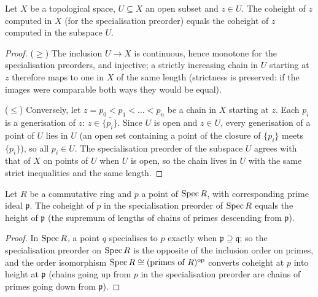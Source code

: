 \begin{lemma}
  \label{pa-lem:coheight_open_embedding}
  \leanok

  Let \(X\) be a topological space, \(U \subseteq X\) an open subset and \(z \in U\).
  The coheight of \(z\) computed in \(X\) (for the specialisation preorder) equals the
  coheight of \(z\) computed in the subspace \(U\).
\end{lemma}
\begin{proof}
  \leanok
  (\(\geq\)) The inclusion \(U \to X\) is continuous, hence monotone for the
  specialisation preorders, and injective; a strictly increasing chain in \(U\) starting
  at \(z\) therefore maps to one in \(X\) of the same length (strictness is preserved:
  if the images were comparable both ways they would be equal).

  (\(\leq\)) Conversely, let \(z = p_0 < p_1 < \dots < p_n\) be a chain in \(X\)
  starting at \(z\). Each \(p_i\) is a generisation of \(z\): \(z \in
  \overline{\{p_i\}}\). Since \(U\) is open and \(z \in U\), every generisation of a
  point of \(U\) lies in \(U\) (an open set containing a point of the closure of
  \(\{p_i\}\) meets \(\{p_i\}\)), so all \(p_i \in U\). The specialisation preorder of
  the subspace \(U\) agrees with that of \(X\) on points of \(U\) when \(U\) is open, so
  the chain lives in \(U\) with the same strict inequalities and the same length.
\end{proof}

\begin{lemma}
  \label{pa-lem:coheight_spec_height}
  \leanok

  Let \(R\) be a commutative ring and \(p\) a point of \(\operatorname{Spec} R\), with corresponding
  prime ideal \(\mathfrak p\). The coheight of \(p\) in the specialisation preorder of
  \(\operatorname{Spec} R\) equals the height of \(\mathfrak p\) (the supremum of lengths of chains of
  primes descending from \(\mathfrak p\)).
\end{lemma}
\begin{proof}
  \leanok
  In \(\operatorname{Spec} R\), a point \(q\) specialises to \(p\) exactly when
  \(\mathfrak p \supseteq \mathfrak q\); so the specialisation preorder on
  \(\operatorname{Spec} R\) is the opposite of the inclusion order on primes, and the order
  isomorphism \(\operatorname{Spec} R \cong (\text{primes of } R)^{\mathrm{op}}\) converts coheight at
  \(p\) into height at \(\mathfrak p\) (chains going up from \(p\) in the
  specialisation preorder are chains of primes going down from \(\mathfrak p\)).
\end{proof}

